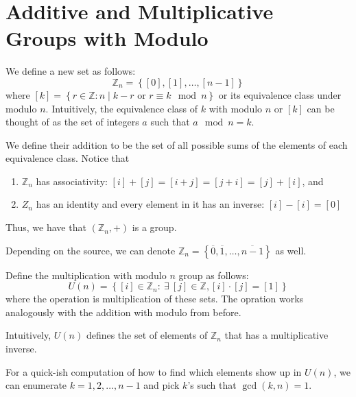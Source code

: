\section{Additive and Multiplicative Groups with Modulo}

\begin{definition}
    We define a new set as follows:
    \[
        \mathbb{Z}_n = \left\{[0], [1], \ldots, [n-1]\right\}
    \]
    where \([k] = \left\{r \in \mathbb{Z} : n \mid k-r \text{ or } r \equiv k \mod n\right\}\) or its equivalence class under modulo \(n\). Intuitively, the equivalence class of \(k\) with modulo \(n\) or \([k]\) can be thought of as the set of integers \(a\) such that \(a \mod n = k\).

    We define their addition to be the set of all possible sums of the elements of each equivalence class. Notice that
    \begin{enumerate}
        \item \(\mathbb{Z}_n\) has associativity: \([i] + [j] = [i + j] = [j + i] = [j] + [i]\), and
        \item \(Z_n\) has an identity and every element in it has an inverse: \([i] - [i] = [0]\)
    \end{enumerate}
    Thus, we have that \((\mathbb{Z}_n, +)\) is a group.
\end{definition}

\begin{remark}
    Depending on the source, we can denote \(\mathbb{Z}_n = \left\{\overline{0}, \overline{1}, \ldots, \overline{n-1}\right\}\) as well.
\end{remark}

\begin{definition}
    Define the multiplication with modulo \(n\) group as follows:
    \[
        U(n) = \left\{[i] \in \mathbb{Z}_n : \ \exists \  [j] \in \mathbb{Z}, [i] \cdot [j] = [1]\right\}
    \]
    where the operation is multiplication of these sets. The opration works analogously with the addition with modulo from before.
\end{definition}

Intuitively, \(U(n)\) defines the set of elements of \(\mathbb{Z}_n\) that has a multiplicative inverse.

For a quick-ish computation of how to find which elements show up in \(U(n)\), we can enumerate \(k = 1, 2, \ldots, n-1\) and pick \(k\)'s such that \(\gcd(k, n) = 1\).

